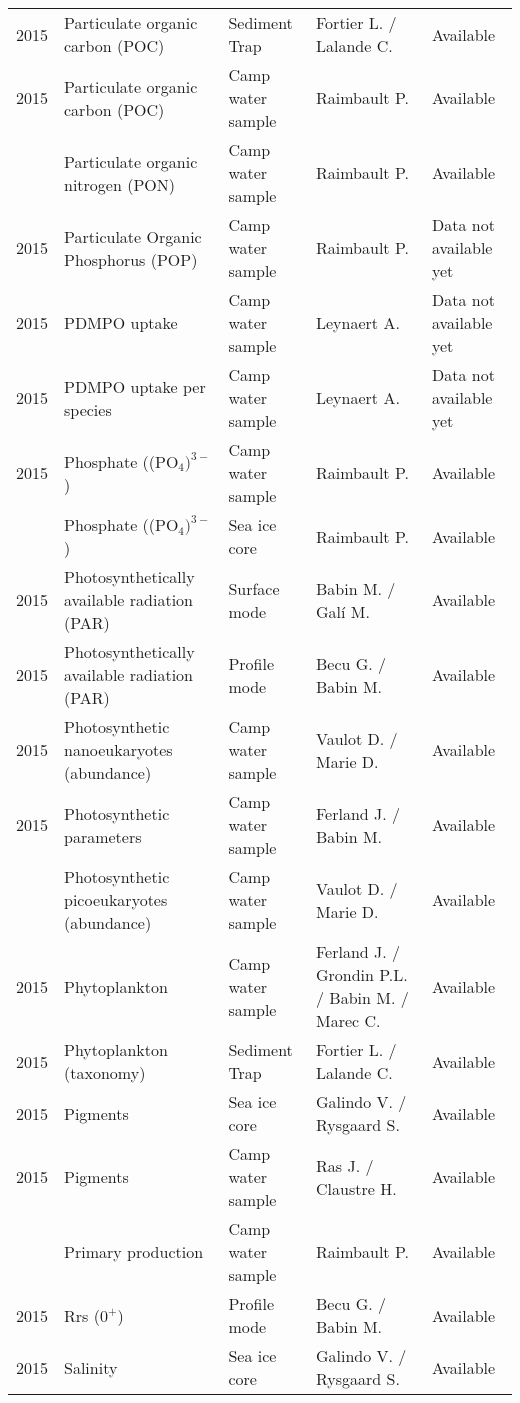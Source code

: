 \documentclass[]{article}
\begin{document}
\begin{landscape}
\begin{longtable}{rllll}
2015 & Particulate organic carbon (POC) & Sediment Trap & Fortier L. / Lalande C. & Available\\
2015 & Particulate organic carbon (POC) & Camp water sample & Raimbault P. & Available\\
\addlinespace
2015 & Particulate organic nitrogen (PON) & Camp water sample & Raimbault P. & Available\\
2015 & Particulate Organic Phosphorus (POP) & Camp water sample & Raimbault P. & Data not available yet\\
2015 & PDMPO uptake & Camp water sample & Leynaert A. & Data not available yet\\
2015 & PDMPO uptake per species & Camp water sample & Leynaert A. & Data not available yet\\
2015 & Phosphate ((PO$_4)^{3-}$) & Camp water sample & Raimbault P. & Available\\
\addlinespace
2015 & Phosphate ((PO$_4)^{3-}$) & Sea ice core & Raimbault P. & Available\\
2015 & Photosynthetically available radiation (PAR) & Surface mode & Babin M. / Galí M. & Available\\
2015 & Photosynthetically available radiation (PAR) & Profile mode & Becu G. / Babin M. & Available\\
2015 & Photosynthetic nanoeukaryotes (abundance) & Camp water sample & Vaulot D. / Marie D. & Available\\
2015 & Photosynthetic parameters & Camp water sample & Ferland J. / Babin M. & Available\\
\addlinespace
2015 & Photosynthetic picoeukaryotes (abundance) & Camp water sample & Vaulot D. / Marie D. & Available\\
2015 & Phytoplankton & Camp water sample & Ferland J. / Grondin P.L. / Babin M. / Marec C. & Available\\
2015 & Phytoplankton (taxonomy) & Sediment Trap & Fortier L. / Lalande C. & Available\\
2015 & Pigments & Sea ice core & Galindo V. / Rysgaard S. & Available\\
2015 & Pigments & Camp water sample & Ras J. / Claustre H. & Available\\
\addlinespace
2015 & Primary production & Camp water sample & Raimbault P. & Available\\
2015 & Rrs ($0^+$) & Profile mode & Becu G. / Babin M. & Available\\
2015 & Salinity & Sea ice core & Galindo V. / Rysgaard S. & Available\\

\end{longtable}
\end{landscape}
\end{document}
